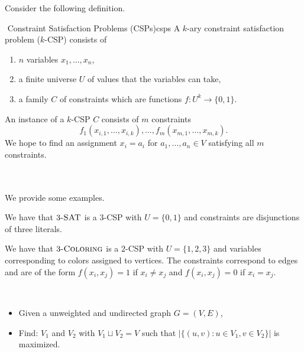         Consider the following definition.
        \begin{definition}{\Stop\,\,Constraint Satisfaction Problems (CSPs)}{csps}
            A \(k\)-ary constraint satisfaction problem (\(k\)-CSP) consists of
            \begin{enumerate}
                \item \(n\) variables \(x_1,\ldots,x_n\),
                \item a finite universe \(U\) of values that the variables can take,
                \item a family \(C\) of constraints which are functions \(f:U^k\to\{0,1\}\).
            \end{enumerate}
            An instance of a \(k\)-CSP \(C\) consists of \(m\) constraints
            \begin{equation*}
                f_1(x_{i,1},\ldots, x_{i,k}),\ldots, f_m(x_{m,1},\ldots, x_{m,k}).
            \end{equation*}
            We hope to find an assignment \(x_i=a_i\) for \(a_1,\ldots,a_n\in V\) satisfying all \(m\) constraints.
        \end{definition}
        \vphantom
        \\
        \\
        We provide some examples.
        \begin{example}
            We have that \(3\textsc{-SAT}\) is a \(3\)-CSP with \(U=\{0,1\}\) and constraints are disjunctions of three literals.
        \end{example}
        \begin{example}
            We have that \(3\textsc{-Coloring}\) is a \(2\)-CSP with \(U=\{1,2,3\}\) and variables corresponding to colors assigned to vertices. The constraints correspond to edges and are of the form \(f(x_i,x_j)=1\) if \(x_i\neq x_j\) and \(f(x_i,x_j)=0\) if \(x_i=x_j\).
        \end{example}
        \begin{compprob} \label{prob:maxcut}
            \vphantom
            \\
            \begin{itemize}
                \item Given a unweighted and undirected graph \(G=(V,E)\),
                \item Find: \(V_1\) and \(V_2\) with \(V_1\sqcup V_2=V\) such that \(|\{(u,v): u\in V_1,v\in V_2\}|\) is maximized.
            \end{itemize}
        \end{compprob}
